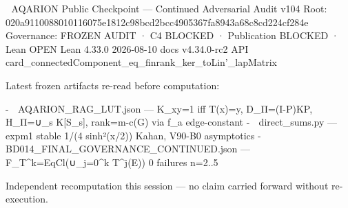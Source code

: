 🔷 AQARION Public Checkpoint — Continued Adversarial Audit v104
Root: 020a9110088010116075e1812c98bcd2bcc4905367fa8943a68c8cd224cf284e
Governance: FROZEN AUDIT · C4 BLOCKED · Publication BLOCKED · Lean OPEN
Lean 4.33.0 2026-08-10 docs v4.34.0-rc2 API card_connectedComponent_eq_finrank_ker_toLin'_lapMatrix

Latest frozen artifacts re-read before computation:

-
📎 AQARION_RAG_LUT.json
— K_{xy}=1 iff T(x)=y, D_Π=(I-P)KP, H_Π=∪_s K[S_s], rank=m-c(G) via f_a edge-constant
-
📎 direct_sums.py
— expm1 stable 1/(4 sinh²(x/2)) Kahan, V90-B0 asymptotics
-
📎 BD014_FINAL_GOVERNANCE_CONTINUED.json
— F_T^k=EqCl(∪_{j=0}^k T^j(E)) 0 failures n=2..5

Independent recomputation this session — no claim carried forward without re-execution.

